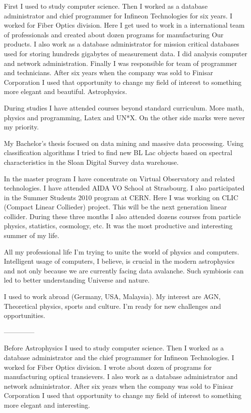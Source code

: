 
First I used to study computer science. Then I worked as a database
administrator and chief programmer for Infineon Technologies for six
years. I worked for Fiber Optics division. Here I get used to work in
a international team of professionals and created about dozen programs
for manufacturing Our products.  I also work as a database
administrator for mission critical databases used for storing hundreds
gigabytes of measurement data. I did analysis computer and network
administration. Finally I was responsible for team of programmer and
technicians. After six years when the company was sold to Finisar
Corporation I used that opportunity to change my field of interest to
something more elegant and beautiful. Astrophysics.

During studies I have attended courses beyond standard
curriculum. More math, physics and programming, Latex and UN*X. On the
other side marks were never my priority.

My Bachelor's thesis focused on data mining and massive data
processing. Using classification algorithms I tried to find new BL Lac
objects based on spectral characteristics in the Sloan Digital Survey
data warehouse.

In the master program I have concentrate on Virtual Observatory and
related technologies. I have attended AIDA VO School at Strasbourg. I
also participated in the Summer Students 2010 program at CERN. Here I
was working on CLIC (Compact Linear Collieder) project. This will be
the next generation linear collider. During these three months I also
attended dozens courses from particle physics, statistics, cosmology,
etc. It was the most productive and interesting summer of my life.

All my professional life I'm trying to unite the world of physics and
computers. Intelligent usage of computers, I believe, is crucial in the
modern astrophysics and not only because we are currently facing data
avalanche. Such symbiosis can led to better understanding Universe and
nature.

I used to work abroad (Germany, USA, Malaysia). My interest are AGN,
Theoretical physics, sports and culture. I'm ready for new challenges
and opportunities.

--------------

 
Before Astrophysics I used to study computer science. Then I worked as
a database administrator and the chief programmer for Infineon
Technologies. I worked for Fiber Optics division. I wrote about dozen
of programs for manufacturing optical transievers. I also work as a
database administrator and network administrator. After six years when
the company was sold to Finisar Corporation I used that opportunity to
change my field of interest to something more elegant and interesting.

